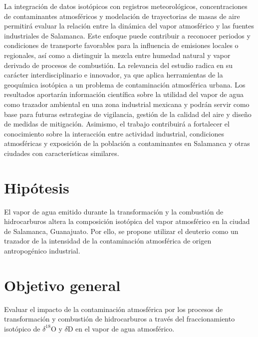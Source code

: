 La integración de datos isotópicos con registros meteorológicos, concentraciones 
de contaminantes atmosféricos y modelación de trayectorias de masas de aire permitirá evaluar 
la relación entre la dinámica del vapor atmosférico y las fuentes industriales de Salamanca. 
Este enfoque puede contribuir a reconocer periodos y condiciones de transporte favorables 
para la influencia de emisiones locales o regionales, así como a distinguir la 
mezcla entre humedad natural y vapor derivado de procesos de combustión. La relevancia 
del estudio radica en su carácter interdisciplinario e innovador, ya que aplica 
herramientas de la geoquímica isotópica a un problema de contaminación atmosférica 
urbana. Los resultados aportarán información científica sobre la utilidad del vapor de agua 
como trazador ambiental en una zona industrial mexicana y podrán servir como base para 
futuras estrategias de vigilancia, gestión de la calidad del aire y diseño de medidas de 
mitigación. Asimismo, el trabajo contribuirá a fortalecer el conocimiento sobre la 
interacción entre actividad industrial, condiciones atmosféricas y exposición de la 
población a contaminantes en Salamanca y otras ciudades con características similares.

\section{Hipótesis}
El vapor de agua emitido durante la transformación y la combustión de hidrocarburos altera 
la composición isotópica del vapor atmosférico en la ciudad de Salamanca, Guanajuato. 
Por ello, se propone utilizar el deuterio como un trazador de la intensidad de la 
contaminación atmosférica de origen antropogénico industrial.

\section{Objetivo general}
Evaluar el impacto de la contaminación atmosférica por los procesos de transformación y combustión 
de hidrocarburos a través 
del fraccionamiento isotópico de $\delta^{18}$O y $\delta$D en el vapor de agua atmosférico.

